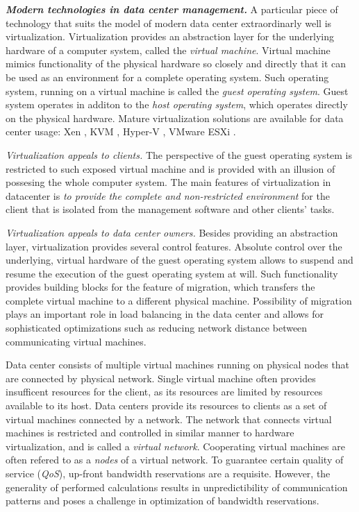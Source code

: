 \textbf{\emph{Modern technologies in data center management.}}
A particular piece of technology that suits the model of modern data center extraordinarly well is virtualization.
Virtualization provides an abstraction layer for the underlying hardware of a computer system, called the \emph{virtual machine}.
Virtual machine mimics functionality of the physical hardware so closely and directly that it can be used as an environment for a complete operating system.
Such operating system, running on a virtual machine is called the \emph{guest operating system}. Guest system operates in additon to the \emph{host operating system}, which operates directly on the physical hardware.
Mature virtualization solutions are available for data center usage: Xen \cite{url-xen}, KVM \cite{url-kvm}, Hyper-V \cite{url-hyperv}, VMware ESXi \cite{url-vmware}.

\emph{Virtualization appeals to clients.}
The perspective of the guest operating system is restricted to such exposed virtual machine and is provided with an illusion of possesing the whole computer system.
The main features of virtualization in datacenter is \emph{to provide the complete and non-restricted environment} for the client that is isolated from the management software and other clients' tasks.

\emph{Virtualization appeals to data center owners.}
Besides providing an abstraction layer, virtualization provides several control features.
Absolute control over the underlying, virtual hardware of the guest operating system allows to suspend and resume the execution of the guest operating system at will.
Such functionality provides building blocks for the feature of migration, which transfers the complete virtual machine to a different physical machine.
Possibility of migration plays an important role in load balancing in the data center and allows for sophisticated optimizations such as reducing network distance between communicating virtual machines.

Data center consists of multiple virtual machines running on physical nodes that are connected by physical network.
Single virtual machine often provides insufficent resources for the client, as its resources are limited by resources available to its host.
Data centers provide its resources to clients as a set of virtual machines connected by a network.
The network that connects virtual machines is restricted and controlled in similar manner to hardware virtualization, and is called a \emph{virtual network}.
Cooperating virtual machines are often refered to as a \emph{nodes} of a virtual network.
To guarantee certain quality of service (\emph{QoS}), up-front bandwidth reservations are a requisite.
However, the generality of performed calculations results in unpredictibility of communication patterns and poses a challenge in optimization of bandwidth reservations.

